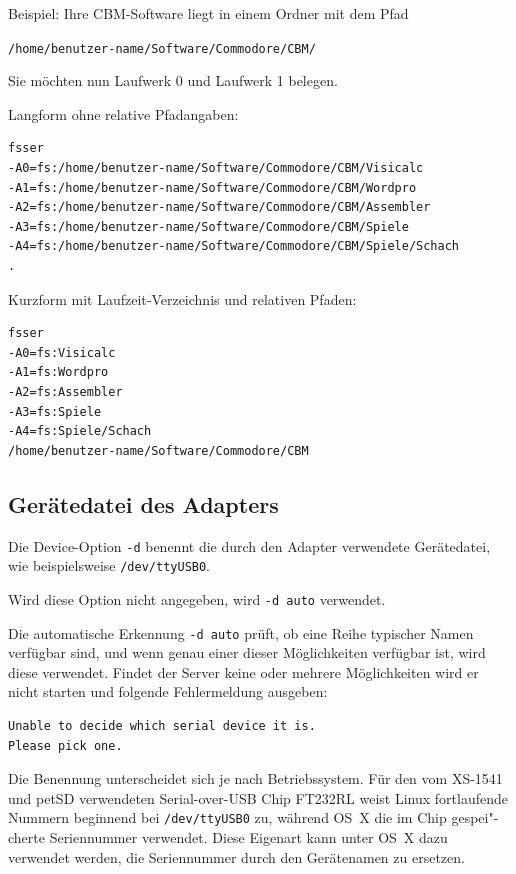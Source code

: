 \documentclass[10pt,a4paper]{scrartcl}		%
\begin{document}
Beispiel: Ihre CBM-Software liegt in einem Ordner mit dem Pfad

\texttt{/home/benutzer-name/Software/Commodore/CBM/}

Sie möchten nun Laufwerk 0 und Laufwerk 1 belegen. 

Langform ohne relative Pfadangaben:

\begin{verbatim}
fsser 
-A0=fs:/home/benutzer-name/Software/Commodore/CBM/Visicalc
-A1=fs:/home/benutzer-name/Software/Commodore/CBM/Wordpro
-A2=fs:/home/benutzer-name/Software/Commodore/CBM/Assembler
-A3=fs:/home/benutzer-name/Software/Commodore/CBM/Spiele
-A4=fs:/home/benutzer-name/Software/Commodore/CBM/Spiele/Schach
.
\end{verbatim}

Kurzform mit Laufzeit-Verzeichnis und relativen Pfaden:

\begin{verbatim}
fsser 
-A0=fs:Visicalc
-A1=fs:Wordpro
-A2=fs:Assembler
-A3=fs:Spiele
-A4=fs:Spiele/Schach
/home/benutzer-name/Software/Commodore/CBM
\end{verbatim}

\subsection{Gerätedatei des Adapters}
\mbox{ }

Die Device-Option \texttt{-d} benennt die durch den
Adapter verwendete Gerätedatei, wie beispielsweise
\texttt{/dev/ttyUSB0}.

Wird diese Option nicht angegeben, wird 
\texttt{-d auto} verwendet.

Die automatische Erkennung \texttt{-d auto}
prüft, ob eine Reihe typischer Namen verfügbar sind, und wenn
genau einer dieser Möglichkeiten verfügbar ist, wird
diese verwendet. Findet der Server keine oder mehrere
Möglichkeiten wird er nicht starten und folgende Fehlermeldung
ausgeben:

\begin{verbatim}
Unable to decide which serial device it is.
Please pick one.
\end{verbatim}

Die Benennung unterscheidet sich je nach Betriebssystem.
Für den vom XS-1541 und petSD verwendeten Serial-over-USB Chip
FT232RL weist Linux 
fortlaufende Nummern beginnend bei \texttt{/dev/ttyUSB0} 
zu, während
\mbox{OS X} die im Chip gespei"-cherte Seriennummer verwendet. 
Diese Eigenart kann unter \mbox{OS X} dazu verwendet werden, die 
Seriennummer durch den Gerätenamen zu ersetzen.
\end{document}
